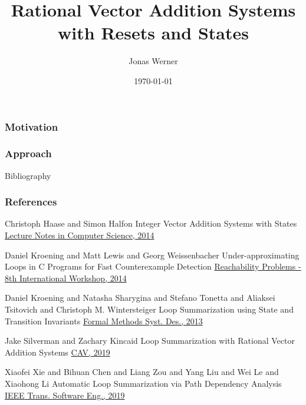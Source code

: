 \documentclass[]{beamer}
\title[\qvasrs]{Rational Vector Addition Systems \\ with Resets and States}
\author[Jonas Werner]{Jonas Werner}
\date{\today}
\begin{document}
\begin{frame}
  \titlepage
\end{frame}

\begin{frame}[t]
	\frametitle{Motivation}
	
\end{frame}

\begin{frame}[t]
	\frametitle{\qvasr}
\end{frame}

\begin{frame}[t]
	\frametitle{\qvasrs}
\end{frame}

\begin{frame}[t]
	\frametitle{Approach}
	\resizebox{11cm}{!}{}
\end{frame}



\begin{frame}{Bibliography}
	\fontsize{6pt}{7.2}\selectfont
	\frametitle{References}
	\begin{thebibliography}{99} %
	 Christoph Haase and	Simon Halfon
	\newblock Integer Vector Addition Systems with States
	\newblock \href{https://doi.org/10.1007/978-3-319-11439-2\_9}{Lecture Notes in Computer Science, 2014}
	
	 Daniel Kroening and
	Matt Lewis and Georg Weissenbacher
	\newblock Under-approximating Loops in C Programs for Fast Counterexample Detection
	\newblock \href{https://doi.org/10.1007/s10703-015-0228-1}{Reachability Problems - 8th International Workshop, 2014}
	
	 Daniel Kroening and
	Natasha Sharygina and Stefano Tonetta and Aliaksei Tsitovich and Christoph M. Wintersteiger
	\newblock Loop Summarization using State and Transition Invariants
	\newblock \href{https://doi.org/10.1007/s10703-012-0176-y}{Formal Methods Syst. Des., 2013}
	
	 Jake Silverman and Zachary Kincaid
	\newblock Loop Summarization with Rational Vector Addition Systems
	\newblock \href{https://doi.org/10.1007/978-3-030-25543-5\_7}{CAV, 2019}
	
	 Xiaofei Xie and
	Bihuan Chen and	Liang Zou and Yang Liu and Wei Le and Xiaohong Li
	\newblock Automatic Loop Summarization via Path Dependency Analysis
	\newblock \href{https://doi.org/10.1109/TSE.2017.2788018}{{IEEE} Trans. Software Eng., 2019}

	\end{thebibliography}

\end{frame}
\end{document}

